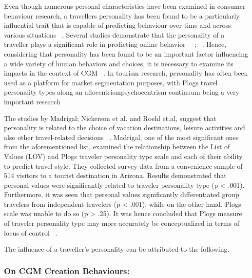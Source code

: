 Even though numerous personal characteristics have been examined in consumer behaviour research, a traveller\textquotesingle s personality has been found to be a particularly influential trait that is capable of predicting behaviour over time and across various situations ~\cite{woszczynski2002exploring}. Several studies demonstrate that the personality of a traveller plays a significant role in predicting online behavior~\cite{yoo2011influence} ~\cite{acar2007online}; ~\cite{tuten2001understanding}. Hence, considering that personality has been found to be an important factor influencing a wide variety of human behaviors and choices, it is necessary to examine its impacts in the context of CGM ~\cite{yoo2011influence}. In tourism research, personality has often been used as a platform for market segmentation purposes, with Plog\textquotesingle s travel personality types along an allocentrism\textemdash psychocentrism continuum being a very important research~\cite{plog1973destination}~\cite{yoo2011influence}.

The studies by Madrigal; Nickerson et al. and Roehl et.al, suggest that personality is related to the choice of vacation destinations, leisure activities and also other travel-related decisions ~\cite{madrigal1995personal, nickerson1991traveler, roehl1992risk}. Madrigal, one of the most significant ones from the aforementioned list, examined the relationship between the List of Values (LOV) and Plog\textquotesingle s traveler personality type scale and each of their ability to predict travel style. They collected survey data from a convenience sample of 514 visitors to a tourist destination in Arizona. Results demonstrated that personal values were significantly related to traveler personality type (p < .001). Furthermore, it was seen that personal values significantly differentiated group travelers from independent travelers (p < .001), while on the other hand, Plog\textquotesingle s scale was unable to do so (p > .25). It was hence concluded that Plog\textquotesingle s measure of traveler personality type may more accurately be conceptualized in terms of locus of control ~\cite{madrigal1995personal}.

The influence of a traveller's personality can be attributed to the following. 

\subsubsection{On CGM Creation Behaviours: }\label{3.1}

